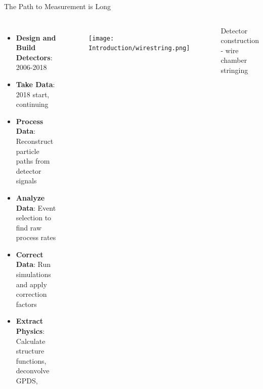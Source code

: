 \documentclass[aspectratio=169]{beamer}
\newcommand*{\myfont}{\fontfamily{lmtt}\selectfont}
\begin{document}
\begin{frame}{The Path to Measurement is Long}
        \begin{columns}[t, onlytextwidth]
            
            \begin{itemize}
                \item \textbf{Design and Build Detectors}: 2006-2018
                \item \textbf{Take Data}: 2018 start, continuing
                \item \textbf{Process Data}: Reconstruct particle paths from detector signals 
                \item \textbf{Analyze Data}: Event selection to find raw process rates
                \item \textbf{Correct Data}: Run simulations and apply correction factors
                \item \textbf{Extract Physics}: Calculate structure functions, deconvolve GPDS, 
            \end{itemize}
                    \begin{figure}
                        \centering
                        \texttt{[image: Introduction/wirestring.png]}
                        
                         
                    \end{figure} 
    \centering
                        Detector construction - wire chamber stringing\\
                         {\myfont{\tiny[V. Burkert et al., NIMA, 959, 163419 (2020)] }}
                 
        \end{columns}
        

\end{frame}
\end{document}
